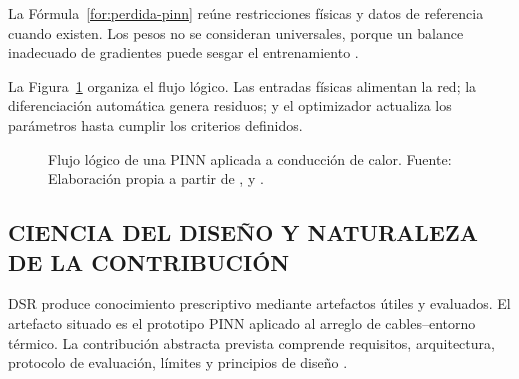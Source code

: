 La Fórmula~\ref{for:perdida-pinn} reúne restricciones físicas y datos de referencia cuando existen. Los pesos no se consideran universales, porque un balance inadecuado de gradientes puede sesgar el entrenamiento \parencites[16]{pan2025}[1--2,17]{lawal2022}.

La Figura~\ref{fig:flujo-pinn} organiza el flujo lógico. Las entradas físicas alimentan la red; la diferenciación automática genera residuos; y el optimizador actualiza los parámetros hasta cumplir los criterios definidos.

\begin{figure}[htbp]
\centering
{}
\caption{Flujo lógico de una PINN aplicada a conducción de calor. Fuente: Elaboración propia a partir de \textcite{raissi2019}, \textcite{lawal2022} y \textcite{pan2025}.}
\label{fig:flujo-pinn}
\end{figure}

\subsection{CIENCIA DEL DISEÑO Y NATURALEZA DE LA CONTRIBUCIÓN}

DSR produce conocimiento prescriptivo mediante artefactos útiles y evaluados. El artefacto situado es el prototipo PINN aplicado al arreglo de cables--entorno térmico. La contribución abstracta prevista comprende requisitos, arquitectura, protocolo de evaluación, límites y principios de diseño \parencite[343--349]{gregor2013}.

